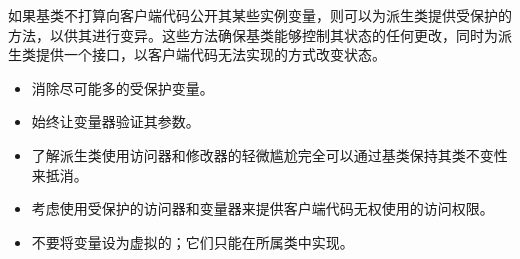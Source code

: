 如果基类不打算向客户端代码公开其某些实例变量，则可以为派生类提供受保护的方法，以供其进行变异。这些方法确保基类能够控制其状态的任何更改，同时为派生类提供一个接口，以客户端代码无法实现的方式改变状态。


\begin{itemize}
\item
消除尽可能多的受保护变量。

\item
始终让变量器验证其参数。

\item
了解派生类使用访问器和修改器的轻微尴尬完全可以通过基类保持其类不变性来抵消。

\item
考虑使用受保护的访问器和变量器来提供客户端代码无权使用的访问权限。

\item
不要将变量设为虚拟的；它们只能在所属类中实现。
\end{itemize}













